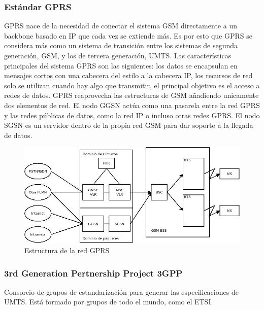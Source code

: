 \subsubsection{Estándar GPRS}
\label{ssub:GPRS}
	GPRS nace de la necesidad de conectar el sistema GSM directamente a un backbone basado en IP que cada vez se extiende más. Es por esto que GPRS se considera más como un sistema de transición entre los sistemas de segunda generación, GSM, y los de tercera generación, UMTS. Las características principales del sistema GPRS son las siguientes: los datos se encapsulan en mensajes cortos con una cabecera del estilo a la cabecera IP, los recursos de red solo se utilizan cuando hay algo que transmitir, el principal objetivo es el acceso a redes de datos. GPRS reaprovecha las estructuras de GSM añadiendo unicamente dos elementos de red. El nodo GGSN actúa como una pasarela entre la red GPRS y las redes públicas de datos, como la red IP o incluso otras redes GPRS. El nodo SGSN es un servidor dentro de la propia red GSM para dar soporte a la llegada de datos.
\begin{figure}[htp]
\centering
\includegraphics[width=\textwidth]{Imagen/diaGPRS.jpg}
\caption{Estructura de la red GPRS}
\label{img:estructuraGPRS}
\end{figure}
\subsubsection{3rd Generation Pertnership Project 3GPP}
\label{ssub:3GPP}
	Consorcio de grupos de estandarización para generar las especificaciones de UMTS. Está formado por grupos de todo el mundo, como el ETSI. 
